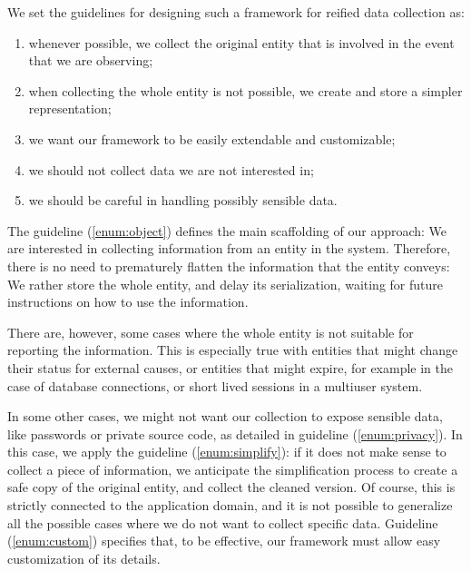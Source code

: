 We set the guidelines for designing such a framework for reified data collection as:

\begin{enumerate}
  \item\label{enum:object} whenever possible, we collect the original entity that is involved in the event that we are observing;
  \item\label{enum:simplify} when collecting the whole entity is not possible, we create and store a simpler representation;
  \item\label{enum:custom} we want our framework to be easily extendable and customizable; 
  \item\label{enum:domain-specific} we should not collect data we are not interested in;
  \item\label{enum:privacy} we should be careful in handling possibly sensible data.
\end{enumerate}

The guideline (\ref{enum:object}) defines the main scaffolding of our approach: We are interested in collecting information from an entity in the system. Therefore, there is no need to prematurely flatten the information that the entity conveys: We rather store the whole entity, and delay its serialization, waiting for future instructions on how to use the information.

There are, however, some cases where the whole entity is not suitable for reporting the information. This is especially true with entities that might change their status for external causes, or entities that might expire, for example in the case of database connections, or short lived sessions in a multiuser system.

In some other cases, we might not want our collection to expose sensible data, like passwords or private source code, as detailed in guideline (\ref{enum:privacy}). In this case, we apply the guideline (\ref{enum:simplify}): if it does not make sense to collect a piece of information, we anticipate the simplification process to create a safe copy of the original entity, and collect the cleaned version. Of course, this is strictly connected to the application domain, and it is not possible to generalize all the possible cases where we do not want to collect specific data. Guideline (\ref{enum:custom}) specifies that, to be effective, our framework must allow easy customization of its details.

